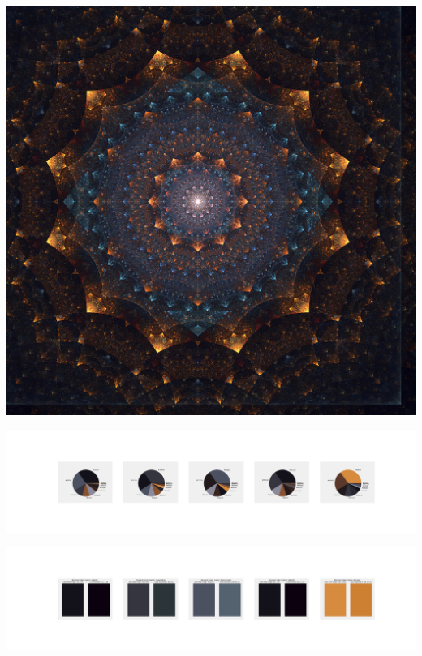 \documentclass[11pt]{article}
\begin{document}
\begin{landscape}
    \begin{center}
    \includegraphics[width=\textwidth]{./nbimg/file (244).jpg}
    \end{center}

    \begin{center}
    \includegraphics[width=250mm]{./nbimg/pie-161.jpg}
    \end{center}

    \begin{center}
    \includegraphics[width=250mm]{./nbimg/peak-161.jpg}
    \end{center}
    


\end{landscape}
\end{document}

